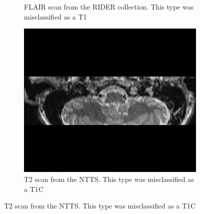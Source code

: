 \begin{figure}[htbp]
\begin{subfigure}[t]{0.25\textwidth}
        \caption{\gls{FLAIR} \gls{scan} from the \gls{RIDER} collection. This \gls{type} was misclassified as a \gls{T1}}\label{fig:RIDER_FLAIR}
    \end{subfigure}
    \hfill
    \begin{subfigure}[t]{0.25\textwidth}
        \centering
        \includegraphics[width=\textwidth]{Figures/T2_hippocampus}
        \caption{\gls{T2} \gls{scan} from the \gls{NTTS}. This \gls{type} was misclassified as a \gls{T1C}}\label{fig:T2_hippo}
    \end{subfigure}


\end{figure}

